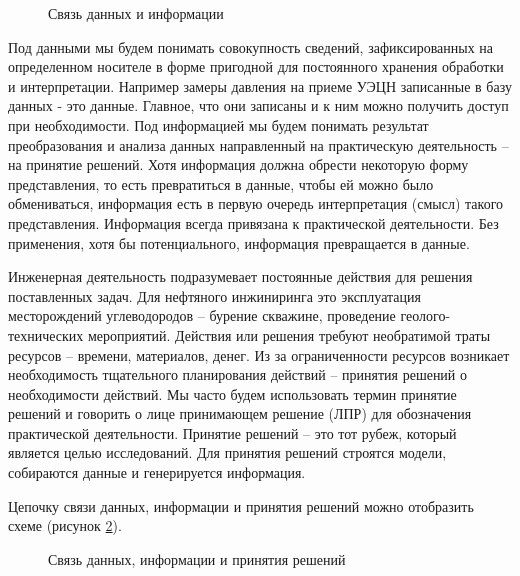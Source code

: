 \begin{figure}[h!]
	\begin{center}
		
		\caption{Связь данных и информации}
		\label{ris:data_info_chart_1}
	\end{center}
\end{figure}

Под данными мы будем понимать совокупность сведений, зафиксированных на определенном носителе в форме пригодной для постоянного хранения обработки и интерпретации. Например замеры давления на приеме УЭЦН записанные в базу данных - это данные. Главное, что они записаны и к ним можно получить доступ при необходимости. 
Под информацией мы будем понимать результат преобразования и анализа данных направленный на практическую деятельность -- на принятие решений. Хотя информация должна обрести некоторую форму представления, то есть превратиться в данные, чтобы ей можно было обмениваться, информация есть в первую очередь интерпретация (смысл) такого представления. Информация всегда привязана к практической деятельности. Без применения, хотя бы потенциального, информация превращается в данные. 

Инженерная деятельность подразумевает постоянные действия для решения поставленных задач. Для нефтяного инжиниринга это эксплуатация месторождений углеводородов -- бурение скважине, проведение геолого-технических мероприятий. Действия или решения требуют необратимой траты ресурсов -- времени, материалов, денег. Из за ограниченности ресурсов возникает необходимость тщательного планирования действий -- принятия решений о необходимости действий. Мы часто будем использовать термин принятие решений и говорить о лице принимающем решение (ЛПР) для обозначения практической деятельности. Принятие решений -- это тот рубеж, который является целью исследований. Для принятия решений строятся модели, собираются данные и генерируется информация. 


Цепочку связи данных, информации и принятия решений можно отобразить схеме (рисунок  \ref{ris:data_info_decision_chart_1}). 

\begin{figure}[h!]
	\begin{center}
		
		\caption{Связь данных, информации и принятия решений}
		\label{ris:data_info_decision_chart_1}
	\end{center}
\end{figure}

